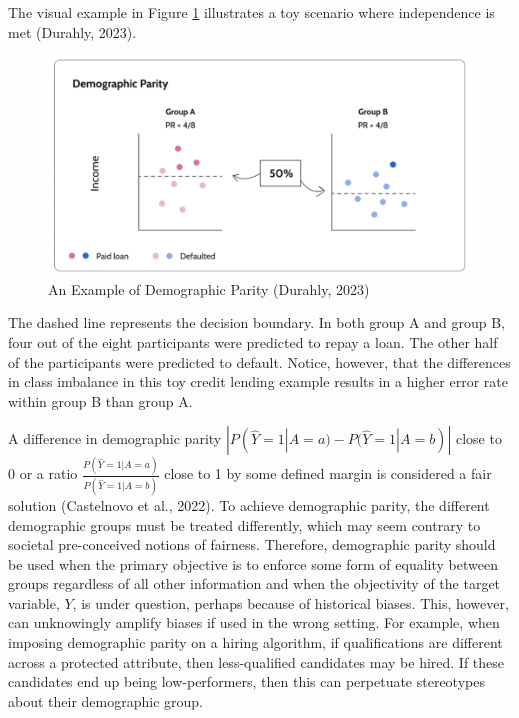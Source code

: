 \documentclass[12pt, twoside]{amherstthesis}
\begin{document}
The visual example in Figure \ref{fig:dp} illustrates a toy scenario where independence is met (Durahly, 2023).
\begin{figure}

{\centering \includegraphics[width=1\linewidth]{figures/dp} 

}

\caption[An Example of Demographic Parity]{An Example of Demographic Parity (Durahly, 2023)}\label{fig:dp}
\end{figure}
The dashed line represents the decision boundary. In both group A and group B, four out of the eight participants were predicted to repay a loan. The other half of the participants were predicted to default. Notice, however, that the differences in class imbalance in this toy credit lending example results in a higher error rate within group B than group A.

A difference in demographic parity \(|P(\hat{Y} = 1 | A = a) - P(\hat{Y} = 1 | A = b)|\) close to 0 or a ratio \(\frac{P(\hat{Y} = 1 | A = a)}{P(\hat{Y} = 1 | A = b)}\) close to 1 by some defined margin is considered a fair solution (Castelnovo et al., 2022). To achieve demographic parity, the different demographic groups must be treated differently, which may seem contrary to societal pre-conceived notions of fairness. Therefore, demographic parity should be used when the primary objective is to enforce some form of equality between groups regardless of all other information and when the objectivity of the target variable, \(Y\), is under question, perhaps because of historical biases. This, however, can unknowingly amplify biases if used in the wrong setting. For example, when imposing demographic parity on a hiring algorithm, if qualifications are different across a protected attribute, then less-qualified candidates may be hired. If these candidates end up being low-performers, then this can perpetuate stereotypes about their demographic group.
\end{document}
